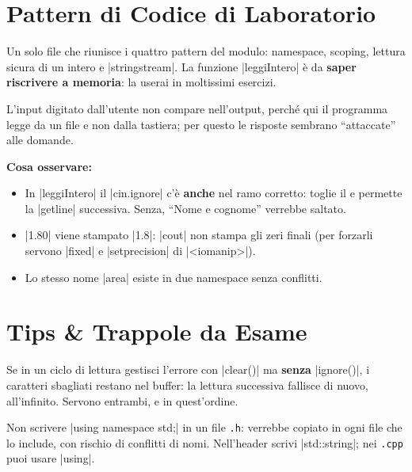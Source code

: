 \section{Pattern di Codice di Laboratorio}

Un solo file che riunisce i quattro pattern del modulo: namespace, scoping,
lettura sicura di un intero e \cc|stringstream|. La funzione \cc|leggiIntero| è
da \textbf{saper riscrivere a memoria}: la userai in moltissimi esercizi.


L'input digitato dall'utente non compare nell'output, perché qui il programma
legge da un file e non dalla tastiera; per questo le risposte sembrano
``attaccate'' alle domande.

\textbf{Cosa osservare:}
\begin{itemize}
  \item In \cc|leggiIntero| il \cc|cin.ignore| c'è \textbf{anche} nel ramo
        corretto: toglie il \nl{} e permette la \cc|getline| successiva.
        Senza, ``Nome e cognome'' verrebbe saltato.
  \item \cc|1.80| viene stampato \cc|1.8|: \cc|cout| non stampa gli zeri finali
        (per forzarli servono \cc|fixed| e \cc|setprecision| di \cc|<iomanip>|).
  \item Lo stesso nome \cc|area| esiste in due namespace senza conflitti.
\end{itemize}

\section{Tips \& Trappole da Esame}

\begin{trappola}
Se in un ciclo di lettura gestisci l'errore con \cc|clear()| ma \textbf{senza}
\cc|ignore()|, i caratteri sbagliati restano nel buffer: la lettura successiva
fallisce di nuovo, all'infinito. Servono entrambi, e in quest'ordine.
\end{trappola}

\begin{trappola}
Non scrivere \cc|using namespace std;| in un file \texttt{.h}: verrebbe copiato
in ogni file che lo include, con rischio di conflitti di nomi. Nell'header scrivi
\cc|std::string|; nei \texttt{.cpp} puoi usare \cc|using|.
\end{trappola}

